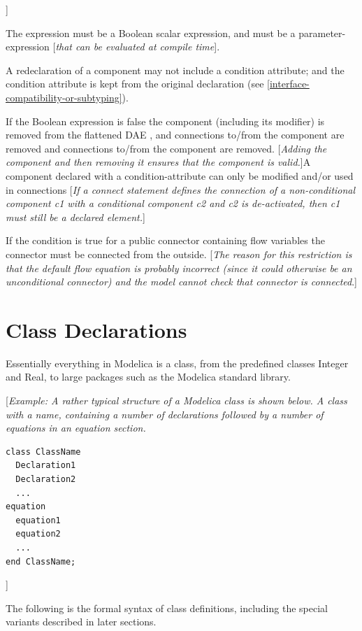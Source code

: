 \documentclass[10pt,a4paper]{report}
\def\doublelabel#1{\label{#1}\hypertarget{#1}{}}
\begin{document}
{]}

The expression must be a Boolean scalar expression, and must be a
parameter-expression {[}\emph{that can be evaluated at compile time}{]}.

A redeclaration of a component may not include a condition attribute;
and the condition attribute is kept from the original declaration (see
\ref{interface-compatibility-or-subtyping}).

If the Boolean expression is false the component (including its
modifier) is removed from the flattened DAE , and connections to/from
the component are removed and connections to/from the component are
removed. {[}\emph{Adding the component and then removing it ensures that
the component is valid.}{]}A component declared with a
condition-attribute can only be modified and/or used in connections
{[}\emph{If a connect statement defines the connection of a
non-conditional component c1 with a conditional component c2 and c2 is
de-activated, then c1 must still be a declared element.}{]}

If the condition is true for a public connector containing flow
variables the connector must be connected from the outside. {[}\emph{The
reason for this restriction is that the default flow equation is
probably incorrect (since it could otherwise be an unconditional
connector) and the model cannot check that connector is connected}.{]}

\section{Class Declarations}\doublelabel{class-declarations}

Essentially everything in Modelica is a class, from the predefined
classes Integer and Real, to large packages such as the Modelica
standard library.

{[}\emph{Example: A rather typical structure of a Modelica class is
shown below. A class with a name, containing a number of declarations
followed by a number of equations in an equation section.}

\begin{lstlisting}[language=modelica]
class ClassName
  Declaration1
  Declaration2
  ...
equation
  equation1
  equation2
  ...
end ClassName;
\end{lstlisting}

{]}

The following is the formal syntax of class definitions, including the
special variants described in later sections.
\end{document}
